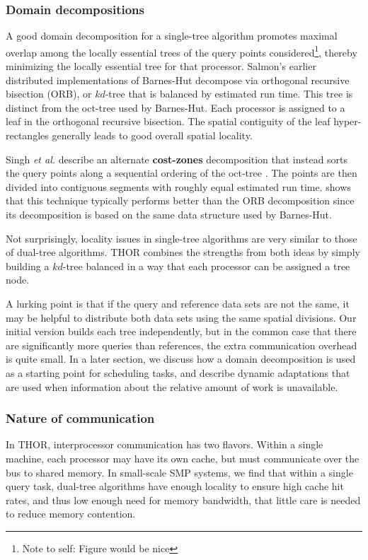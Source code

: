 \documentclass[twoside,leqno,twocolumn]{article}
\newcommand{\authornote}[1]{\footnote{Note to self: #1}}
\newcommand{\authorsnote}[1]{\authornote{#1}}
\newcommand{\mysubsub}[1]{\subsubsection{#1} }
\newcommand{\defterm}[1]{{\bf #1}}
\begin{document}
\mysubsub{Domain decompositions}
A good domain decomposition for a single-tree algorithm promotes maximal overlap among the locally essential trees of the query points considered\authorsnote{Figure would be nice}, thereby minimizing the locally essential tree for that processor.
Salmon's earlier distributed implementations of Barnes-Hut \cite{salmon_thesis} decompose via orthogonal recursive bisection (ORB), or $kd$-tree that is balanced by estimated run time.
This tree is distinct from the oct-tree used by Barnes-Hut.
Each processor is assigned to a leaf in the orthogonal recursive bisection.
The spatial contiguity of the leaf hyper-rectangles generally leads to good overall spatial locality.

Singh {\it et al.} describe an alternate \defterm{cost-zones} decomposition that instead sorts the query points along a sequential ordering of the oct-tree \cite{singh95load}.
The points are then divided into contiguous segments with roughly equal estimated run time.
\cite{singh95load} shows that this technique typically performs better than the ORB decomposition since its decomposition is based on the same data structure used by Barnes-Hut.

Not surprisingly, locality issues in single-tree algorithms are very similar to those of dual-tree algorithms.
THOR combines the strengths from both ideas by simply building a $kd$-tree balanced in a way that each processor can be assigned a tree node.

A lurking point is that if the query and reference data sets are not the same, it may be helpful to distribute both data sets using the same spatial divisions.
Our initial version builds each tree independently, but in the common case that there are significantly more queries than references, the extra communication overhead is quite small.
In a later section, we discuss how a domain decomposition is used as a starting point for scheduling tasks, and describe dynamic adaptations that are used when information about the relative amount of work is unavailable.

\mysubsub{Nature of communication}

In THOR, interprocessor communication has two flavors.
Within a single machine, each processor may have its own cache, but must communicate over the bus to shared memory.
In small-scale SMP systems, we find that within a single query task, dual-tree algorithms have enough locality to ensure high cache hit rates, and thus low enough need for memory bandwidth, that little care is needed to reduce memory contention.
\end{document}
